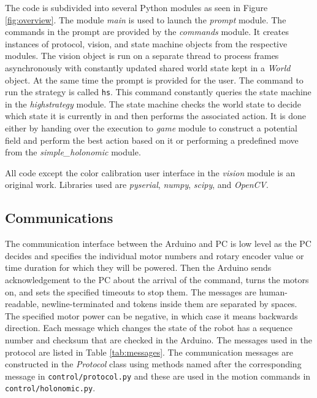\documentclass[a4paper,12pt]{article}
\begin{document}
The code is subdivided into several Python modules as seen in Figure \ref{fig:overview}. The module \textit{main} is used to launch the \textit{prompt} module. The commands in the prompt are provided by the \textit{commands} module. It creates instances of protocol, vision, and state machine objects from the respective modules. The vision object is run on a separate thread to process frames asynchronously with constantly updated shared world state kept in a \textit{World} object. At the same time the prompt is provided for the user. The command to run the strategy is called \texttt{hs}. This command constantly queries the state machine in the \textit{highstrategy} module. The state machine checks the world state to decide which state it is currently in and then performs the associated action. It is done either by handing over the execution to \textit{game} module to construct a potential field and perform the best action based on it or performing a predefined move from the \textit{simple\_holonomic} module.

All code except the color calibration user interface in the \textit{vision} module is an original work. Libraries used are \textit{pyserial}, \textit{numpy}, \textit{scipy}, and \textit{OpenCV}.

\subsection{Communications}

The communication interface between the Arduino and PC is low level as the PC decides and specifies the individual motor numbers and rotary encoder value or time duration for which they will be powered. Then the Arduino sends acknowledgement to the PC about the arrival of the command, turns the motors on, and sets the specified timeouts to stop them. The messages are human-readable, newline-terminated and tokens inside them are separated by spaces. The specified motor power can be negative, in which case it means backwards direction. Each message which changes the state of the robot has a sequence number and checksum that are checked in the Arduino. The messages used in the protocol are listed in Table \ref{tab:messages}. The communication messages are constructed in the \textit{Protocol} class using methods named after the corresponding message in \texttt{control/protocol.py} and these are used in the motion commands in \texttt{control/holonomic.py}.
\end{document}
